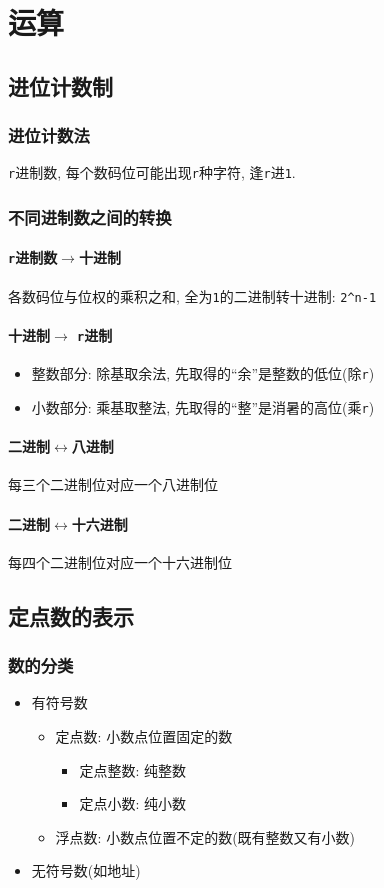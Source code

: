 \chapter{运算}
\section{进位计数制}
\subsection{进位计数法}
\verb|r|进制数, 每个数码位可能出现\verb|r|种字符, 逢\verb|r|进\verb|1|.
\subsection{不同进制数之间的转换}
\subsubsection{\texttt{r}进制数$ \rightarrow $十进制}
各数码位与位权的乘积之和, 全为\verb|1|的二进制转十进制: \verb|2^n-1|
\subsubsection{十进制$ \rightarrow $ \texttt{r}进制}
\begin{itemize}
\item 整数部分: 除基取余法, 先取得的``余''是整数的低位(除\verb|r|)
\item 小数部分: 乘基取整法, 先取得的``整''是消暑的高位(乘\verb|r|)
\end{itemize}
\subsubsection{二进制$ \leftrightarrow $八进制}
每三个二进制位对应一个八进制位
\subsubsection{二进制$ \leftrightarrow $十六进制}
每四个二进制位对应一个十六进制位
\section{定点数的表示}
\subsection{数的分类}
\begin{itemize}
\item 有符号数
\begin{itemize}
\item 定点数: 小数点位置固定的数
\begin{itemize}
\item 定点整数: 纯整数
\item 定点小数: 纯小数
\end{itemize}
\item 浮点数: 小数点位置不定的数(既有整数又有小数)
\end{itemize}
\item 无符号数(如地址)
\end{itemize}

